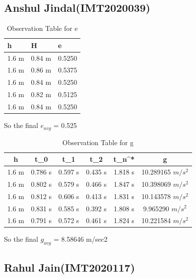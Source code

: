 \documentclass[11pt]{scrartcl} %
\begin{document}
\subsection{Anshul Jindal(IMT2020039)}

\begin{table}[h] %
	\centering %
	\begin{tabular}{l l l}
		\toprule
		\textbf{h} & \textbf{H} & \textbf{e} \\
		\midrule
		1.6 m & 0.84 m & 0.5250\\
        1.6 m & 0.86 m & 0.5375\\
        1.6 m & 0.84 m & 0.5250\\
        1.6 m & 0.82 m & 0.5125 \\
        1.6 m & 0.84 m & 0.5250 \\
		\bottomrule
	\end{tabular}
	\caption{Observation Table for e}
\end{table}
So the final $e_{avg}$ = 0.525

\begin{table}[h]
\centering
\begin{tabular}{||c c c c c c||} 
\toprule
 \hline
 h & t_0 & t_1 & t_2 & t_n^* & g \\ [0.5ex] 
 \midrule
 \hline\hline
 1.6 m & 0.786 s & 0.597 s  & 0.435 s & 1.818 s & 10.289165 $m/s^2$ \\
 \hline
 1.6 m & 0.802 s & 0.579 s & 0.466 s & 1.847 s & 10.398069 $m/s^2$  \\
 \hline
 1.6 m & 0.812 s & 0.606 s & 0.413 s & 1.831 s  & 10.143578 $m/s^2$ \\
 \hline
 1.6 m & 0.831 s & 0.585 s & 0.392 s & 1.808 s  & 9.965290 $m/s^2$  \\
 \hline
 1.6 m & 0.791 s & 0.572 s & 0.461 s & 1.824 s  & 10.221584 $m/s^2$ \\ [1ex]
 \bottomrule
 \hline
\end{tabular}
\caption{Observation Table for g}
\end{table}
So the final $g_{avg}$ = 8.58646 m/sec2
\newpage
\subsection{Rahul Jain(IMT2020117)}
\end{document}
